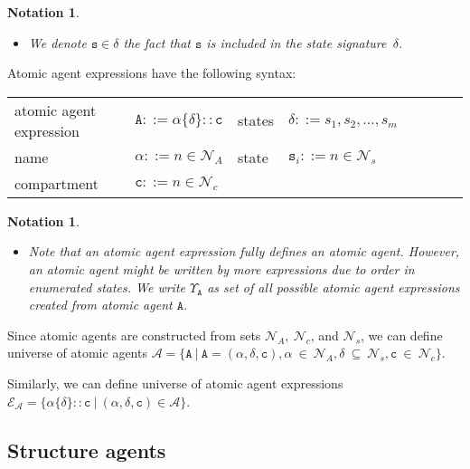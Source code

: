 \documentclass{entcs}
\renewcommand{\~}[0]{\texttildelow}
\newtheorem{notation}[thm]{Notation}
\begin{document}
\begin{notation}
{~}
\begin{itemize}
\item We denote $\mathtt{s}\in\delta$ the fact that $\mathtt{s}$ is included in the state signature~$\delta$.
\end{itemize}
\end{notation}

Atomic agent expressions have the following syntax:

\begin{center}
{\small
\hspace*{-1cm}\begin{tabular}{ ll ll ll ll }
 atomic agent expression & $\mathtt{A} ::= \alpha\{\delta\}::\mathtt{c}$ & states & $ \delta ::= s_1, s_2, ..., s_m$ \\
 name & $\alpha ::= n \in \mathcal{N}_{A}$  & state & $\mathtt{s}_i ::= n \in \mathcal{N}_{s}$\\
 compartment & $\mathtt{c} ::= n \in \mathcal{N}_{c}$\\
\end{tabular}
}
\end{center}

\begin{notation}
{~}
\begin{itemize}
\item Note that an atomic agent expression fully defines an atomic agent. However, an atomic agent might be written by more expressions due to order in enumerated states. We write $\Upsilon_\mathtt{A}$ as set of all possible atomic agent expressions created from atomic agent $\mathtt{A}$.
\end{itemize}
\end{notation}

\begin{theorem}
Since atomic agents are constructed from sets $\mathcal{N}_{A},~\mathcal{N}_{c}$, and $\mathcal{N}_{s}$, we can define universe of atomic agents $\mathcal{A} = \{ \mathtt{A}~|~\mathtt{A} = (\alpha, \delta, \mathtt{c}), \alpha~\in~\mathcal{N}_{A}, \delta~\subseteq~\mathcal{N}_{s},  \mathtt{c}~\in~\mathcal{N}_{c} \}$. 

\noindent Similarly, we can define universe of atomic agent expressions\\ $\mathcal{E}_\mathcal{A} = \{ \alpha\{\delta\}::\mathtt{c} ~|~ (\alpha, \delta, \mathtt{c}) \in \mathcal{A} \} $.
\end{theorem}

\subsection{Structure agents}
\end{document}
